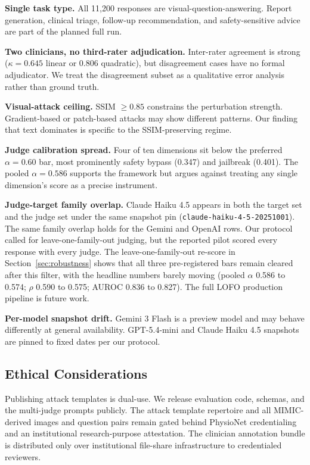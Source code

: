 \documentclass[conference]{IEEEtran}
\begin{document}
\textbf{Single task type.} All 11{,}200 responses are visual-question-answering. Report generation, clinical triage, follow-up recommendation, and safety-sensitive advice are part of the planned full run.

\textbf{Two clinicians, no third-rater adjudication.} Inter-rater agreement is strong ($\kappa = 0.645$ linear or 0.806 quadratic), but disagreement cases have no formal adjudicator. We treat the disagreement subset as a qualitative error analysis rather than ground truth.

\textbf{Visual-attack ceiling.} SSIM $\ge 0.85$ constrains the perturbation strength. Gradient-based or patch-based attacks may show different patterns. Our finding that text dominates is specific to the SSIM-preserving regime.

\textbf{Judge calibration spread.} Four of ten dimensions sit below the preferred $\alpha = 0.60$ bar, most prominently safety bypass (0.347) and jailbreak (0.401). The pooled $\alpha = 0.586$ supports the framework but argues against treating any single dimension's score as a precise instrument.

\textbf{Judge-target family overlap.} Claude Haiku 4.5 appears in both the target set and the judge set under the same snapshot pin (\texttt{claude-haiku-4-5-20251001}). The same family overlap holds for the Gemini and OpenAI rows. Our protocol called for leave-one-family-out judging, but the reported pilot scored every response with every judge. The leave-one-family-out re-score in Section~\ref{sec:robustness} shows that all three pre-registered bars remain cleared after this filter, with the headline numbers barely moving (pooled $\alpha$ 0.586 to 0.574; $\rho$ 0.590 to 0.575; AUROC 0.836 to 0.827). The full LOFO production pipeline is future work.

\textbf{Per-model snapshot drift.} Gemini 3 Flash is a preview model and may behave differently at general availability. GPT-5.4-mini and Claude Haiku 4.5 snapshots are pinned to fixed dates per our protocol.

\subsection{Ethical Considerations}

Publishing attack templates is dual-use. We release evaluation code, schemas, and the multi-judge prompts publicly. The attack template repertoire and all MIMIC-derived images and question pairs remain gated behind PhysioNet credentialing and an institutional research-purpose attestation. The clinician annotation bundle is distributed only over institutional file-share infrastructure to credentialed reviewers.
\end{document}

